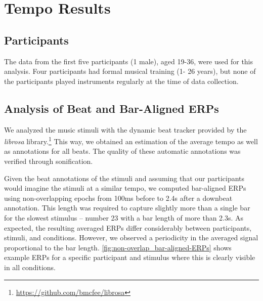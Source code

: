 \section*{Tempo Results}
\subsection*{Participants}
The data from the first five participants (1 male), aged 19-36, were used for this analysis. Four participants had formal musical training (1- 26 years), but none of the participants played instruments regularly at the time of data collection.

\subsection*{Analysis of Beat and Bar-Aligned ERPs}

We analyzed the music stimuli with the dynamic beat tracker \cite{ellis_beat_2007} provided by the \emph{librosa} library.\footnote{%
\url{https://github.com/bmcfee/librosa}}
This way, we obtained an estimation of the average tempo as well as annotations for all beats. %
The quality of these automatic annotations was verified through sonification.

Given the beat annotations of the stimuli and assuming that our participants would imagine the stimuli at a similar tempo, 
we computed bar-aligned ERPs using non-overlapping epochs from 100ms before to 2.4s after a downbeat annotation.
This length was required to capture slightly more than a single bar for the slowest stimulus -- number 23 with a bar length of more than 2.3s.
As expected, the resulting averaged ERPs differ considerably between participants, stimuli, and conditions.
However, we observed a periodicity in the averaged signal proportional to the bar length.
%
\autoref{fig:non-overlap_bar-aligned-ERPs} shows example ERPs 
for a specific participant and stimulus where this is clearly visible in all conditions.

